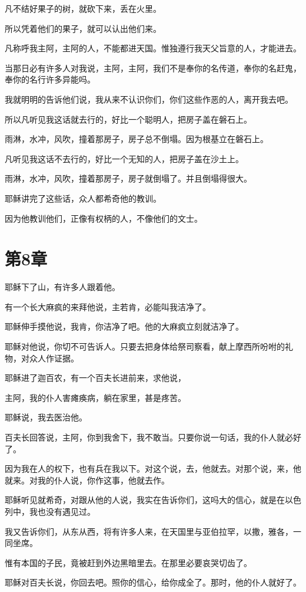 \documentclass[12pt,oneside]{book}
\begin{document}
凡不结好果子的树，就砍下来，丢在火里。

所以凭着他们的果子，就可以认出他们来。

凡称呼我主阿，主阿的人，不能都进天国。惟独遵行我天父旨意的人，才能进去。

当那日必有许多人对我说，主阿，主阿，我们不是奉你的名传道，奉你的名赶鬼，奉你的名行许多异能吗。

我就明明的告诉他们说，我从来不认识你们，你们这些作恶的人，离开我去吧。

所以凡听见我这话就去行的，好比一个聪明人，把房子盖在磐石上。

雨淋，水冲，风吹，撞着那房子，房子总不倒塌。因为根基立在磐石上。

凡听见我这话不去行的，好比一个无知的人，把房子盖在沙土上。

雨淋，水冲，风吹，撞着那房子，房子就倒塌了。并且倒塌得很大。

耶稣讲完了这些话，众人都希奇他的教训。

因为他教训他们，正像有权柄的人，不像他们的文士。

\chapter{第8章}
耶稣下了山，有许多人跟着他。

有一个长大麻疯的来拜他说，主若肯，必能叫我洁净了。

耶稣伸手摸他说，我肯，你洁净了吧。他的大麻疯立刻就洁净了。

耶稣对他说，你切不可告诉人。只要去把身体给祭司察看，献上摩西所吩咐的礼物，对众人作证据。

耶稣进了迦百农，有一个百夫长进前来，求他说，

主阿，我的仆人害瘫痪病，躺在家里，甚是疼苦。

耶稣说，我去医治他。

百夫长回答说，主阿，你到我舍下，我不敢当。只要你说一句话，我的仆人就必好了。

因为我在人的权下，也有兵在我以下。对这个说，去，他就去。对那个说，来，他就来。对我的仆人说，你作这事，他就去作。

耶稣听见就希奇，对跟从他的人说，我实在告诉你们，这吗大的信心，就是在以色列中，我也没有遇见过。

我又告诉你们，从东从西，将有许多人来，在天国里与亚伯拉罕，以撒，雅各，一同坐席。

惟有本国的子民，竟被赶到外边黑暗里去。在那里必要哀哭切齿了。

耶稣对百夫长说，你回去吧。照你的信心，给你成全了。那时，他的仆人就好了。
\end{document}
